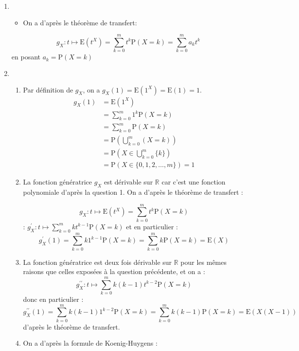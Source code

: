\begin{correction}

\begin{enumerate}
\item 
\begin{itemize}
  \item On a d'après le théorème de transfert:
\end{itemize}
$$
g_{X}: t \mapsto \mathrm{E}\left(t^{X}\right)=\sum_{k=0}^{m} t^{k} \mathrm{P}(X=k)=\sum_{k=0}^{m} a_{k} t^{k} 
$$
 en posant  $a_{k}=\mathrm{P}(X=k)$

\item \begin{enumerate}

  \item Par définition de $g_{X}$, on a $g_{X}(1)=\mathrm{E}\left(1^{X}\right)=\mathrm{E}(1)=1$.
  \begin{align*}
g_{X}(1)&=\mathrm{E}\left(1^{X}\right)\\
&=\sum_{k=0}^{m} 1^{k} \mathrm{P}(X=k)\\
&=\sum_{k=0}^{m} \mathrm{P}(X=k)\\
&=\mathrm{P}\left(\bigcup_{k=0}^{m}(X=k)\right)\\
&=\mathrm{P}\left(X \in \bigcup_{k=0}^{m}\{k\}\right)\\
&=\mathrm{P}(X \in\{0,1,2, \ldots, m\})=1
  \end{align*}

\item 
 La fonction génératrice $g_{X}$ est dérivable sur $\mathbb{R}$ car c'est une fonction polynomiale d'après la question 1. On a d'après le théorème de transfert :

$$
g_{X}: t \mapsto \mathrm{E}\left(t^{X}\right)=\sum_{k=0}^{m} t^{k} \mathrm{P}(X=k) $$
: $ g_{X}^{\prime}: t \mapsto \sum_{k=0}^{m} k t^{k-1} \mathrm{P}(X=k)
$
et en particulier :
$$
g_{X}^{\prime}(1)=\sum_{k=0}^{m} k 1^{k-1} \mathrm{P}(X=k)=\sum_{k=0}^{m} k \mathrm{P}(X=k)=\mathrm{E}(X)
$$


\item  La fonction génératrice est deux fois dérivable sur $\mathbb{R}$ pour les mêmes raisons que celles exposées à la question précédente, et on a :
$$
g_{X}^{\prime \prime}: t \mapsto \sum_{k=0}^{m} k(k-1) t^{k-2} \mathrm{P}(X=k)
$$
donc en particulier :
$$
g_{X}^{\prime \prime}(1)=\sum_{k=0}^{m} k(k-1) 1^{k-2} \mathrm{P}(X=k)=\sum_{k=0}^{m} k(k-1) \mathrm{P}(X=k)=\mathrm{E}(X(X-1))
$$
d'après le théorème de transfert.
\item  On a d'après la formule de Koenig-Huygens :


\end{enumerate}
\end{enumerate}
\end{correction}

